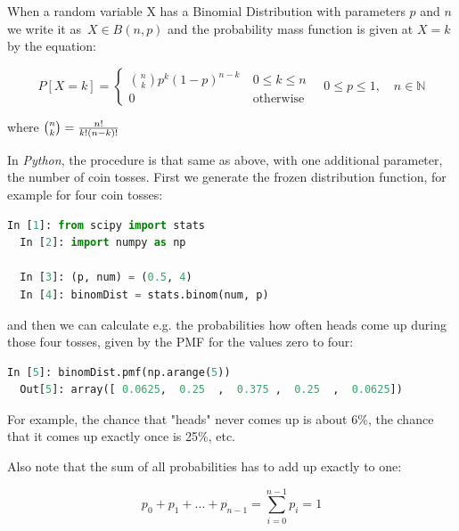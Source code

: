 When a random variable X has a Binomial Distribution with parameters $p$ and $n$ we write it as $\,X \in B(n,p)$ and the probability mass function is given at $X=k$ by the equation:

\begin{equation}
    P\left[X = k\right] = \begin{cases} {n \choose k} p^k \left(1-p\right)^{n-k}\ & 0 \le k \le n \\ 0 & \mbox{otherwise} \end{cases} \quad 0 \leq p \leq 1, \quad n \in \mathbb{N}
\end{equation}

where ${n \choose k}={n! \over k!(n-k)!}$

\vspace{5 mm}

In \emph{Python}, the procedure is that same as above, with one additional parameter, the number of coin tosses. First we generate the frozen distribution function, for example for four coin tosses:

\begin{lstlisting}[language=Python]
  In [1]: from scipy import stats
  In [2]: import numpy as np

  In [3]: (p, num) = (0.5, 4)
  In [4]: binomDist = stats.binom(num, p)
\end{lstlisting}

and then we can calculate e.g. the probabilities how often heads come up during those four tosses, given by the PMF for the values zero to four:

\begin{lstlisting}[language=Python]
  In [5]: binomDist.pmf(np.arange(5))
  Out[5]: array([ 0.0625,  0.25  ,  0.375 ,  0.25  ,  0.0625])
\end{lstlisting}

For example, the chance that "heads" never comes up is about 6\%, the chance that it comes up exactly once is 25\%, etc.

Also note that the sum of all probabilities has to add up exactly to one:

\begin{equation}\label{eq:discreteSum}
  p_0 + p_1 + ... + p_{n-1} = \sum_{i=0}^{n-1} p_i = 1
\end{equation}

